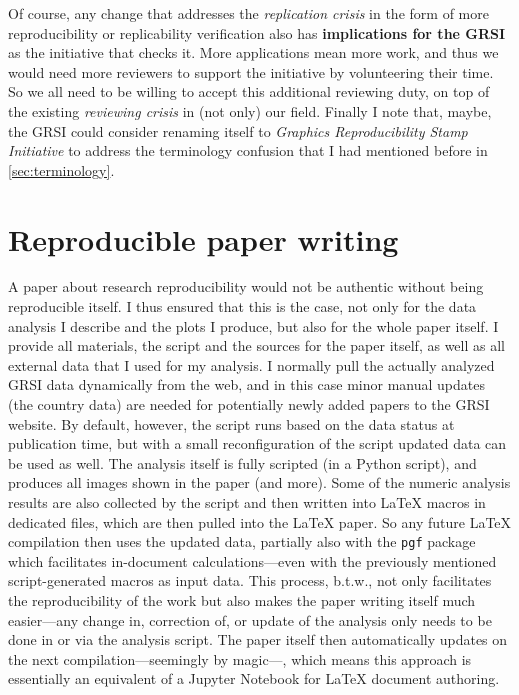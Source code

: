 \documentclass[conference,svgnames]{vgtc}                     %
\begin{document}
Of course, any change that addresses the \emph{replication crisis} in the form of more reproducibility or replicability verification also has \textbf{implications for the GRSI} as the initiative that checks it. More applications mean more work, and thus we would need more reviewers to support the initiative by volunteering their time. So we all need to be willing to accept this additional reviewing duty, on top of the existing \emph{reviewing crisis} in (not only) our field. Finally I note that, maybe, the GRSI could consider renaming itself to \emph{Graphics Reproducibility Stamp Initiative} to address the terminology confusion that I had mentioned before in \autoref{sec:terminology}. 

\section{Reproducible paper writing}
\label{sec:analysis-reproducibility}

A paper about research reproducibility would not be authentic without being reproducible itself. I thus ensured that this is the case, not only for the data analysis I describe and the plots I produce, but also for the whole paper itself. I provide all materials, the script and the sources for the paper itself, as well as all external data that I used for my analysis. I normally pull the actually analyzed GRSI data dynamically from the web, and in this case minor manual updates (the country data) are needed for potentially newly added papers to the GRSI website. By default, however, the script runs based on the data status at publication time, but with a small reconfiguration of the script updated data can be used as well. The analysis itself is fully scripted (in a Python script), and produces all images shown in the paper (and more). Some of the numeric analysis results are also collected by the script and then written into \LaTeX{} macros in dedicated files, which are then pulled into the \LaTeX{} paper. So any future \LaTeX{} compilation then uses the updated data, partially also with the \texttt{pgf} package which facilitates in-document calculations---even with the previously mentioned script-generated macros as input data. This process, b.t.w., not only facilitates the reproducibility of the work but also makes the paper writing itself much easier---any change in, correction of, or update of the analysis only needs to be done in or via the analysis script. The paper itself then automatically updates on the next compilation---seemingly by magic---, which means this approach is essentially an equivalent of a Jupyter Notebook for \LaTeX{} document authoring.
\end{document}
